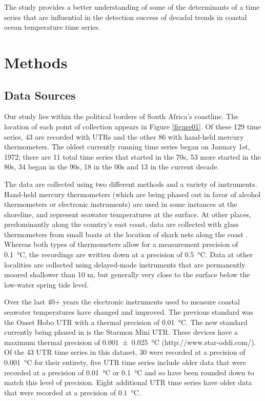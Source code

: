 \documentclass[]{ametsoc}
\begin{document}
The study provides a better understanding of some of the determinants of a time series that are influential in the detection success of decadal trends in coastal ocean temperature time series.

\section{Methods}

\subsection{Data Sources}
Our study lies within the political borders of South Africa's coastline. The location of each point of collection appears in Figure \ref{figure01}. Of these 129 time series, 43 are recorded with UTRs and the other 86 with hand-held mercury thermometers. The oldest currently running time series began on January 1st, 1972; there are 11 total time series that started in the 70s, 53 more started in the 80s, 34 began in the 90s, 18 in the 00s and 13 in the current decade.

The data are collected using two different methods and a variety of instruments. Hand-held mercury thermometers (which are being phased out in favor of alcohol thermometers or electronic instruments) are used in some instances at the shoreline, and represent seawater temperatures at the surface. At other places, predominantly along the country's east coast, data are collected with glass thermometers from small boats at the location of shark nets along the coast \citep{Cliff1988}. Whereas both types of thermometers allow for a measurement precision of \SI{0.1}{\degreeCelsius}, the recordings are written down at a precision of \SI{0.5}{\degreeCelsius}. Data at other localities are collected using delayed-mode instruments that are permanently moored shallower than 10 m, but generally very close to the surface below the low-water spring tide level.

Over the last 40+ years the electronic instruments used to measure coastal seawater temperatures have changed and improved. The previous standard was the Onset Hobo UTR with a thermal precision of \SI{0.01}{\degreeCelsius}. The new standard currently being phased in is the Starmon Mini UTR. These devices have a maximum thermal precision of \SI[separate-uncertainty = true, multi-part-units = repeat]{0.001(25)}{\degreeCelsius} (http://www.star-oddi.com/). Of the 43 UTR time series in this dataset, 30 were recorded at a precision of \SI{0.001}{\degreeCelsius} for their entirety, five UTR time series include older data that were recorded at a precision of \SI{0.01}{\degreeCelsius} or \SI{0.1}{\degreeCelsius} and so have been rounded down to match this level of precision. Eight additional UTR time series have older data that were recorded at a precision of \SI{0.1}{\degreeCelsius}.
\end{document}
